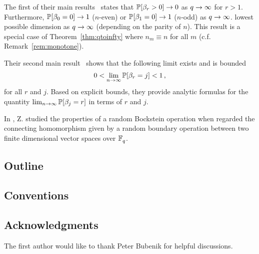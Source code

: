The first of their main results~\cite[Thm 2.1]{ginzburg2017random} states that
$\mathbb{P}[\beta_r > 0] \rightarrow 0$ as $q \rightarrow \infty$ for $r>1$. Furthermore, $\mathbb{P}[\beta_0
= 0] \rightarrow 1$ ($n$-even) or $\mathbb{P}[\beta_1 = 0] \rightarrow 1$ ($n$-odd) as $q \rightarrow \infty$.
lowest possible dimension as $q \rightarrow \infty$ (depending on the parity of $n$).
This result is a special case of Theorem~\ref{thm:qtoinfty} where $n_m \equiv
n$ for all $m$ (c.f.  Remark~\ref{rem:monotone}).

Their second main result~\cite[Thm 2.2]{ginzburg2017random} shows that 
the following limit exists and is bounded
\[
  0 < \lim_{n \rightarrow \infty} \mathbb{P}[\beta_r = j] < 1 \, ,
\]
for all $r$ and $j$. Based on explicit bounds, they provide analytic
formulas for the quantity $\lim_{n\rightarrow \infty}\mathbb{P}[\beta_j=r]$ in terms
of $r$ and $j$.

In \cite{zabka2018random}, Z. studied the properties of a random Bockstein operation when regarded the connecting homomorphism given by a random boundary operation between two finite dimensional vector spaces over $\mathbb{F}_q^{}$. 


\subsection*{Outline}

\subsection*{Conventions}

\subsection*{Acknowledgments} The first author would like to thank
Peter Bubenik for helpful discussions.
